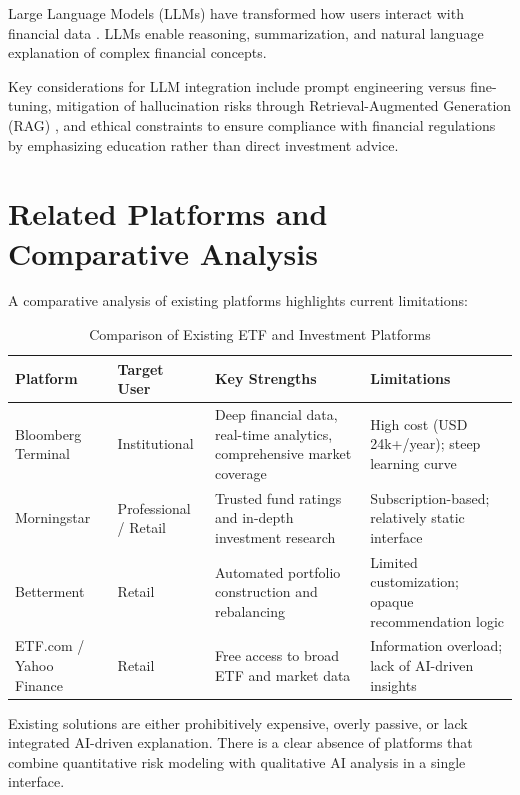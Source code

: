 Large Language Models (LLMs) have transformed how users interact with financial data \cite{bagattiniLLM}. LLMs enable reasoning, summarization, and natural language explanation of complex financial concepts.

Key considerations for LLM integration include prompt engineering versus fine-tuning, mitigation of hallucination risks through Retrieval-Augmented Generation (RAG) \cite{lewis2020}, and ethical constraints to ensure compliance with financial regulations by emphasizing education rather than direct investment advice.

\section{Related Platforms and Comparative Analysis}

A comparative analysis of existing platforms highlights current limitations:

\begin{table}[h]
\centering
\setlength{\tabcolsep}{6pt}
{\small
\begin{tabular}{p{2cm} p{2cm} p{4.5cm} p{4.5cm}}
\toprule
\textbf{Platform} & \textbf{Target User} & \textbf{Key Strengths} & \textbf{Limitations} \\
\midrule
Bloomberg Terminal & Institutional &
Deep financial data, real-time analytics, comprehensive market coverage &
High cost (USD 24k+/year); steep learning curve \\

Morningstar & Professional / Retail &
Trusted fund ratings and in-depth investment research &
Subscription-based; relatively static interface \\

Betterment & Retail &
Automated portfolio construction and rebalancing &
Limited customization; opaque recommendation logic \\

ETF.com / Yahoo Finance & Retail &
Free access to broad ETF and market data &
Information overload; lack of AI-driven insights \\
\bottomrule
\end{tabular}
}
\caption{Comparison of Existing ETF and Investment Platforms}
\end{table}


Existing solutions are either prohibitively expensive, overly passive, or lack integrated AI-driven explanation. There is a clear absence of platforms that combine quantitative risk modeling with qualitative AI analysis in a single interface.


